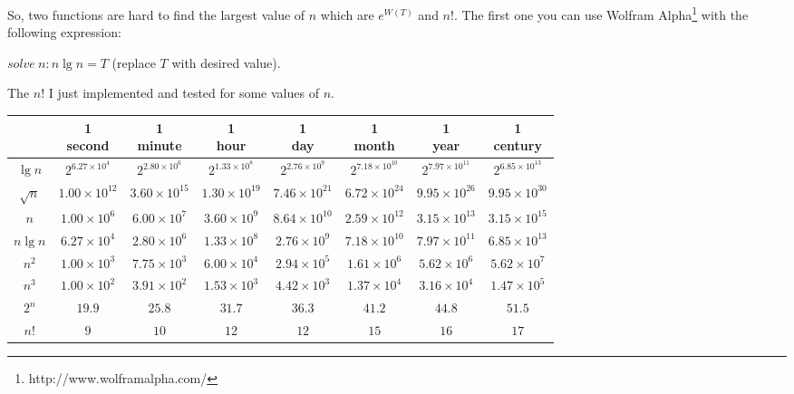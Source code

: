 \documentclass[11pt, oneside]{article}          %
\begin{document}
So, two functions are hard to find the largest value of $n$ which are $e^{W(T)}$ and $n!$. The first one you can use
Wolfram Alpha\footnote{http://www.wolframalpha.com/} with the following expression:

$solve\ n: n \lg n = T$ (replace $T$ with desired value).

The $n!$ I just implemented and tested for some values of $n$.

\begin{center}
  \begin{tabular}{ *{8}{c|} }
    & \shortstack{1 \\ second} & \shortstack{1 \\ minute} & \shortstack{1 \\ hour}%
      & \shortstack{1 \\ day} & \shortstack{1 \\ month} & \shortstack{1 \\ year}%
      & \shortstack{1 \\ century} \\ \hline

      $\lg n$   & $2^{6.27 \times 10^4}$ & $2^{2.80 \times 10^6}$ & $2^{1.33 \times 10^8}$ & $2^{2.76 \times 10^9}$ & $2^{7.18 \times 10^{10}}$ & $2^{7.97 \times 10^{11}}$ & $2^{6.85 \times 10^{13}}$ \\
      $\sqrt n$ & $1.00 \times 10^{12}$  & $3.60 \times 10^{15}$  & $1.30 \times 10^{19}$  & $7.46 \times 10^{21}$  & $6.72 \times 10^{24}$     & $9.95 \times 10^{26}$     & $9.95 \times 10^{30}$ \\
      $n$       & $1.00 \times 10^6$     & $6.00 \times 10^7$     & $3.60 \times 10^9$     & $8.64 \times 10^{10}$  & $2.59 \times 10^{12}$     & $3.15 \times 10^{13}$     & $3.15 \times 10^{15}$ \\
      $n \lg n$ & $6.27 \times 10^4$     & $2.80 \times 10^6$     & $1.33 \times 10^8$     & $2.76 \times 10^9$     & $7.18 \times 10^{10}$     & $7.97 \times 10^{11}$     & $6.85 \times 10^{13}$ \\
      $n^2$     & $1.00 \times 10^3$     & $7.75 \times 10^3$     & $6.00 \times 10^4$     & $2.94 \times 10^5$     & $1.61 \times 10^6$        & $5.62 \times 10^6$        & $5.62 \times 10^7$ \\
      $n^3$     & $1.00 \times 10^2$     & $3.91 \times 10^2$     & $1.53 \times 10^3$     & $4.42 \times 10^3$     & $1.37 \times 10^4$        & $3.16 \times 10^4$        & $1.47 \times 10^5$ \\
      $2^n$     & $19.9$                 & $25.8$                 & $31.7$                 & $36.3$                 & $41.2$                    & $44.8$                    & $51.5$ \\
      $n!$      & $9$                    & $10$                   & $12$                   & $12$                   & $15$                      & $16$                      & $17$
    \end{tabular}
\end{center}
\end{document}
